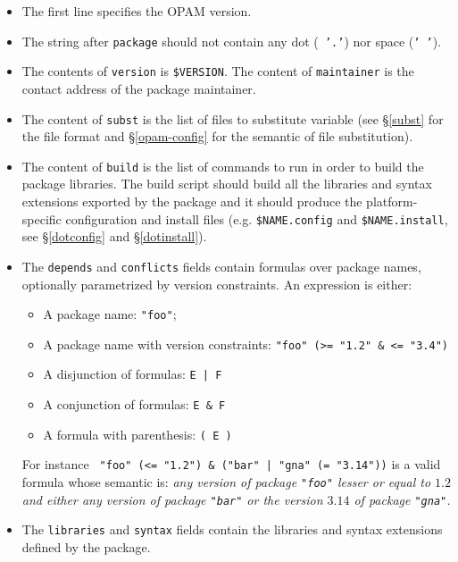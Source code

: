 \documentclass[a4paper,11pt]{article}
\begin{document}
\begin{itemize}

\item The first line specifies the OPAM version.

\item The string after {\tt package} should not contain any dot ({\tt
  '.'}) nor space ({\tt ' '}).

\item The contents of {\tt version} is \verb+$VERSION+. The content of
  {\tt maintainer} is the contact address of the package maintainer.

\item The content of {\tt subst} is the list of files to substitute
  variable (see \S\ref{subst} for the file format and
  \S\ref{opam-config} for the semantic of file substitution).

\item The content of {\tt build} is the list of commands to run in
  order to build the package libraries. The build script should build
  all the libraries and syntax extensions exported by the package and
  it should produce the platform-specific configuration and install
  files (e.g. \verb+$NAME.config+ and \verb+$NAME.install+, see
  \S\ref{dotconfig} and \S\ref{dotinstall}).

\item The {\tt depends} and {\tt conflicts} fields contain formulas
  over package names, optionally parametrized by version
  constraints. An expression is either:

\begin{itemize}
\item A package name: {\tt "foo"};
\item A package name with version constraints:
  \verb+"foo" (>= "1.2" & <= "3.4")+
\item A disjunction of formulas: \verb+E | F+
\item A conjunction of formulas: \verb+E & F+
\item A formula with parenthesis: \verb+( E )+
\end{itemize}

For instance \verb+ "foo" (<= "1.2") & ("bar" | "gna" (= "3.14"))+
is a valid formula whose semantic is: {\em any version of package
  {\tt "foo"} lesser or equal to $1.2$ and either any version of
  package {\tt "bar"} or the version $3.14$ of package {\tt "gna"}.}
\\

\item The {\tt libraries} and {\tt syntax} fields contain the
  libraries and syntax extensions defined by the package.

\end{itemize}
\end{document}
